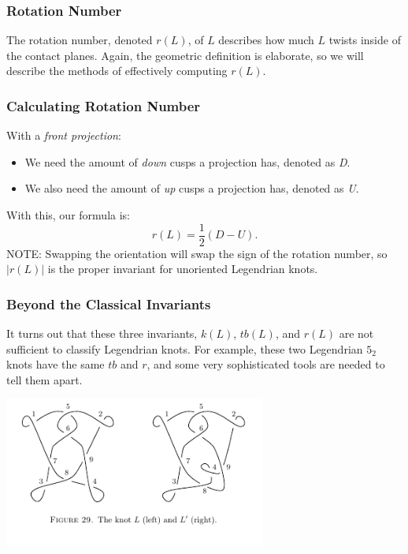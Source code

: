 \documentclass{beamer}
\begin{document}
\begin{frame}
    \frametitle{Rotation Number}
    The \alert{rotation number}, denoted \alert{$r(L)$}, of $L$ describes how
    much $L$ twists inside of the contact planes.
    Again, the geometric definition is elaborate, so we will describe the
    methods of effectively computing $r(L)$.
\end{frame}


\begin{frame}
    \frametitle{Calculating Rotation Number}
    With a \textit{front projection}:
    \begin{itemize}
        \item{We need the amount of \textit{down} cusps a projection has, denoted
        as \textit{D}.}
      \item{We also need the amount of \textit{up} cusps a projection has,
      denoted as \textit{U}.}
    \end{itemize}
    With this, our formula is:
    \[r(L) = \frac{1}{2}(D - U).\]
    \alert{NOTE}: Swapping the orientation will swap the sign of the rotation number,
    so $|r(L)|$ is the proper invariant for unoriented Legendrian knots.
\end{frame}

\begin{frame}
    \frametitle{Beyond the Classical Invariants}
    It turns out that these three invariants, $k(L)$, $tb(L)$, and $r(L)$
    are not sufficient to classify Legendrian knots. For example, these
    two Legendrian $5_2$ knots have the same $tb$ and $r$, and some very
    sophisticated tools are needed to tell them apart.

    \begin{center}
    \includegraphics[height=5cm]{diffKnots.jpg}
    \end{center}
\end{frame}


     
    
\end{document}
